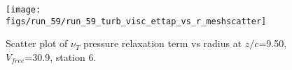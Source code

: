 \begin{figure}[H]
\centering
\texttt{[image: figs/run\_59/run\_59\_turb\_visc\_ettap\_vs\_r\_meshscatter]}
\caption{Scatter plot of $\nu_T$ pressure relaxation term vs radius at $z/c$=9.50, $V_{free}$=30.9, station 6.}
\label{fig:run_59_turb_visc_ettap_vs_r_meshscatter}
\end{figure}


